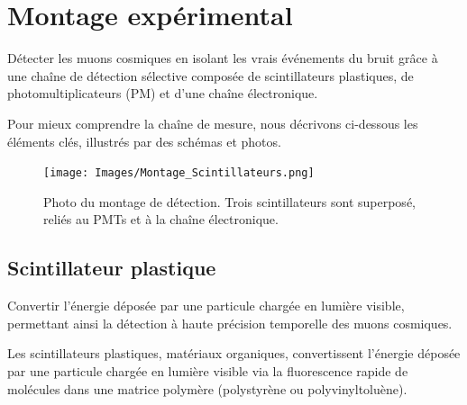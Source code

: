 \documentclass[a4paper,12pt,twoside]{article}
\begin{document}
\newpage

\section{Montage expérimental}


\vspace{1em}
\begin{center}
\begin{tcolorbox}[colback=blue!5!white, colframe=blue!60!black, title=Principe du montage expérimental]
Détecter les muons cosmiques en isolant les vrais événements du bruit grâce à une chaîne de détection sélective composée de scintillateurs plastiques, de photomultiplicateurs (PM) et d’une chaîne électronique.
\end{tcolorbox}
\end{center}

Pour mieux comprendre la chaîne de mesure, nous décrivons ci-dessous les éléments clés, illustrés par des schémas et photos.

\begin{figure}[H]
  \centering
  \texttt{[image: Images/Montage\_Scintillateurs.png]}
  \caption{Photo du montage de détection. Trois scintillateurs sont superposé, reliés au PMTs et à la chaîne électronique.}
  \label{fig:setup}
\end{figure}

\newpage

\subsection{Scintillateur plastique}



\begin{center}
\begin{tcolorbox}[colback=blue!5!white, colframe=blue!60!black, title=Principe du scintillateur plastique]
Convertir l’énergie déposée par une particule chargée en lumière visible, permettant ainsi la détection à haute précision temporelle des muons cosmiques.
\end{tcolorbox}
\end{center}


Les scintillateurs plastiques, matériaux organiques, convertissent l'énergie déposée par une particule chargée en lumière visible via la fluorescence rapide de molécules dans une matrice polymère (polystyrène ou polyvinyltoluène).
\end{document}
